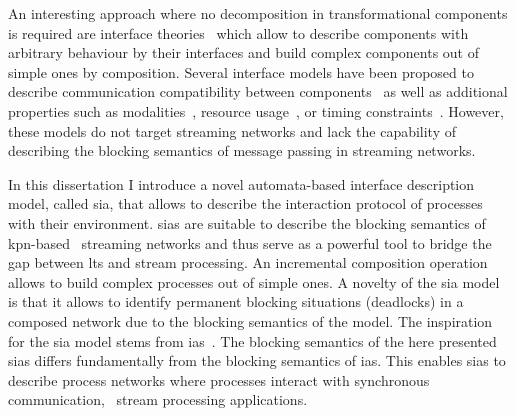 An interesting approach where no decomposition in transformational components is required are interface theories~\cite{deAlfaro2001} which allow to describe components with arbitrary behaviour by their interfaces and build complex components out of simple ones by composition.
Several interface models have been proposed to describe communication compatibility between components~\cite{deAlfaro2001a, larsen2006, hennicker2015} as well as additional properties such as modalities~\cite{larsen2007}, resource usage~\cite{chakrabarti2003, thiele2006}, or timing constraints~\cite{dealfaro2002, henzinger2006a}.
However, these models do not target streaming networks and lack the capability of describing the blocking semantics of message passing in streaming networks.

In this dissertation I introduce a novel automata-based interface description model, called \gls{sia}, that allows to describe the interaction protocol of processes with their environment.
\Glspl{sia} are suitable to describe the blocking semantics of \gls{kpn}-based~\cite{kahn1974} streaming networks and thus serve as a powerful tool to bridge the gap between \gls{lts} and stream processing.
An incremental composition operation allows to build complex processes out of simple ones.
A novelty of the \gls{sia} model is that it allows to identify permanent blocking situations (\eg deadlocks) in a composed network due to the blocking semantics of the model.
The inspiration for the \gls{sia} model stems from \glspl{ia}~\cite{deAlfaro2001a}.
The blocking semantics of the here presented \glspl{sia} differs fundamentally from the blocking semantics of \glspl{ia}.
This enables \glspl{sia} to describe process networks where processes interact with synchronous communication, \eg~stream processing applications.

